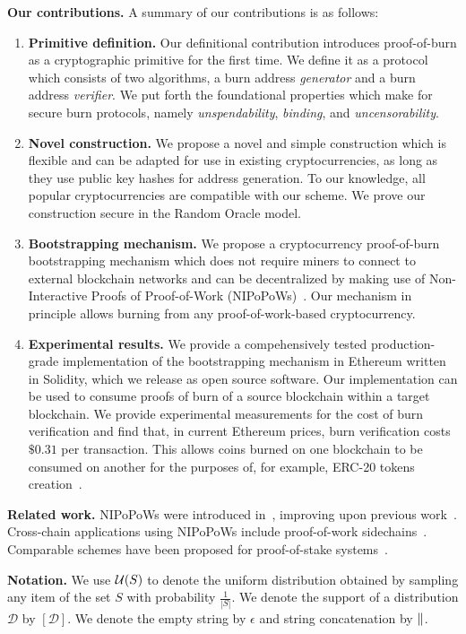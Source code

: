 \noindent
\textbf{Our contributions.}
A summary of our contributions is as follows:
\begin{enumerate}[wide, labelwidth=!, labelindent=0pt, label=(\roman*)]
    \item \textbf{Primitive definition.} Our definitional contribution introduces proof-of-burn as a cryptographic primitive for the first time. We
    define it as a protocol which consists of two algorithms, a burn address \emph{generator} and a burn address \emph{verifier}. We put forth the foundational properties which make for secure burn protocols, namely \emph{unspendability}, \emph{binding}, and \emph{uncensorability}.
    \item \textbf{Novel construction.} We propose a novel and simple construction which is flexible and can be adapted for use in existing cryptocurrencies, as long as they use public key hashes for address generation. To our knowledge, all popular cryptocurrencies are
    compatible with our scheme. We prove our construction secure in the Random Oracle model.
    \item \textbf{Bootstrapping mechanism.} We propose a cryptocurrency proof-of-burn bootstrapping mechanism which does not require miners to connect to external blockchain networks and can be decentralized by making use of Non-Interactive Proofs of Proof-of-Work (NIPoPoWs)~\cite{nipopows}. Our mechanism in principle allows burning from any proof-of-work-based cryptocurrency.
    \item \textbf{Experimental results.} We provide a compehensively tested production-grade implementation of the bootstrapping mechanism in Ethereum
    written in Solidity, which we release as open source software. Our implementation can be used to consume proofs of burn of a source blockchain
    within a target blockchain. We provide experimental measurements for the cost of burn verification and find that, in current Ethereum prices,
    burn verification costs $\$0.31$ per transaction.
    This allows coins burned on one blockchain to be consumed on another for the purposes of, for example, ERC-20 tokens creation~\cite{erc20}.
\end{enumerate}

\noindent
\textbf{Related work.}
NIPoPoWs were introduced in~\cite{nipopows}, improving upon previous work~\cite{popow,highway}. Cross-chain applications using NIPoPoWs include proof-of-work sidechains~\cite{pow-sidechains}. Comparable schemes have been proposed for proof-of-stake systems~\cite{pos-sidechains}.


\noindent
\textbf{Notation.} We use $\mathcal{U}(S)$ to denote the uniform distribution
obtained by sampling any item of the set $S$ with probability $\frac{1}{|S|}$.
We denote the support of a distribution $\mathcal{D}$ by $[\mathcal{D}]$.
We denote the empty string by $\epsilon$ and string concatenation by $\mathbin{\|}$.
